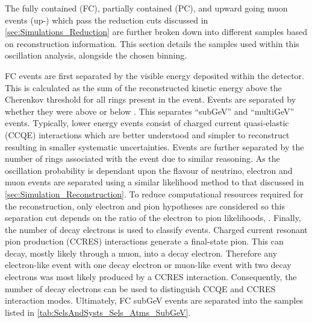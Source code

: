 The fully contained (FC), partially contained (PC), and upward going muon events (up-\quickmath{\mu}) which pass the reduction cuts discussed in \autoref{sec:Simulations_Reduction} are further broken down into different samples based on reconstruction information. This section details the samples used within this oscillation analysis, alongside the chosen binning.

FC events are first separated by the visible energy deposited within the detector. This is calculated as the sum of the reconstructed kinetic energy above the Cherenkov threshold for all rings present in the event. Events are separated by whether they were above or below . This separates ``subGeV'' and ``multiGeV'' events. Typically, lower energy events consist of charged current quasi-elastic (CCQE) interactions which are better understood and simpler to reconstruct resulting in smaller systematic uncertainties. Events are further separated by the number of rings associated with the event due to similar reasoning. As the oscillation probability is dependant upon the flavour of neutrino, electron and muon events are separated using a similar likelihood method to that discussed in \autoref{sec:Simulation_Reconstruction}. To reduce computational resources required for the reconstruction, only electron and pion hypotheses are considered so this separation cut depends on the ratio of the electron to pion likelihoods, . Finally, the number of decay electrons is used to classify events. Charged current resonant pion production (CCRES) interactions generate a final-state pion. This can decay, mostly likely through a muon, into a decay electron. Therefore any electron-like event with one decay electron or muon-like event with two decay electrons was most likely produced by a CCRES interaction. Consequently, the number of decay electrons can be used to distinguish CCQE and CCRES interaction modes. Ultimately, FC subGeV events are separated into the samples listed in \autoref{tab:SelsAndSysts_Sels_Atms_SubGeV}.

